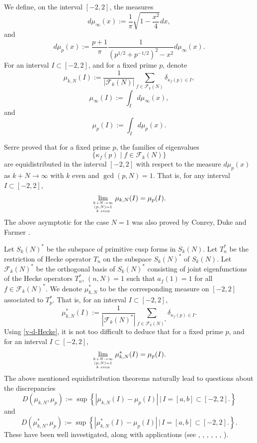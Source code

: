 \documentclass[reqno]{amsart}
\theoremstyle{plain}
\theoremstyle{definition}
\theoremstyle{remark}
\begin{document}
We define, on the interval $[-2,2]$, the measures 
$$d\mu_{\infty}(x) := \frac{1}{\pi}\sqrt{1 - \frac{x^2}{4}}dx,$$
and
$$d\mu_p(x):=\frac{p+1}{\pi}\frac{1}{(p^{1/2}+p^{-1/2})^2-x^2}d\mu_{\infty}(x).$$ 
For an interval $I \subset [-2,2]$, and for a fixed prime $p$, denote
$$\mu_{k,N}(I):= \frac{1}{|\mathcal{F}_k(N)|}\sum_{f\in \mathcal{F}_k(N)}\delta_{\kappa_f(p) \in I},$$
$$\mu_{\infty}(I) := \int_I d\mu_{\infty}(x),$$
and
$$\mu_p(I) := \int_I d\mu_p(x).$$


Serre \cite{Serre} proved that for a fixed prime $p$, the families of eigenvalues
$$\{\kappa_f(p) \mid f \in \mathcal F_k(N)\}$$
are equidistributed in the interval $[-2,2]$ with respect to the measure $d\mu_p(x)$
as $k+N\rightarrow \infty$ with $k$ even and $\gcd(p,N)=1.$  That is, for any interval $I \subset [-2,2]$,
\begin{equation}\label{v-d-Hecke}
\lim_{k+N\rightarrow \infty \atop {(p,N) = 1 \atop{k \text{ even}}}} \mu_{k,N}(I) = \mu_p(I).
\end{equation}
The above asymptotic for the case $N=1$ was also proved by Conrey, Duke and Farmer \cite{CDF}.  

Let $S_k(N)^*$ be the subspace of primitive cusp forms in $S_k(N)$.  Let $T^*_n$ be the restriction of Hecke operator $T_n$ on the subspace $S_k(N)^*$ of $S_k(N)$.  Let 
$\mathcal{F}_k(N)^*$ be the orthogonal basis of $S_k(N)^*$ consisting of joint eigenfunctions of the Hecke operators $T_n^*$, $(n,N) = 1$ such that $a_f(1) = 1$ for all $f \in \mathcal{F}_k(N)^*$.
We denote $\mu_{k,N}^*$ to be the corresponding measure on $[-2,2]$ associated to $T^*_p$.  That is, for an interval $I \subset [-2,2]$,
$$\mu_{k,N}^*(I):= \frac{1}{|\mathcal{F}_k(N)^*|}\sum_{f\in \mathcal{F}_k(N)^*}\delta_{\kappa_f(p) \in I}. $$
Using \eqref{v-d-Hecke}, it is not too difficult to deduce that for a fixed prime $p$, and for an interval $I \subset [-2,2]$,
\begin{equation}\label{v-d-Hecke-new}
\lim_{k+N\rightarrow \infty \atop {(p,N) = 1 \atop{k \text{ even}}}} \mu_{k,N}^*(I) = \mu_p(I).
\end{equation}
The above mentioned equidistribution theorems naturally lead to questions about the discrepancies 
$$D(\mu_{k,N},\mu_p) := \sup\left\{   |\mu_{k,N}(I)-\mu_p(I)|\, \Big|\, I=[a,b]\subset [-2,2] \Big. \right\}$$
and
$$D(\mu_{k,N}^*,\mu_p) := \sup\left\{   |\mu^*_{k,N}(I)-\mu_p(I)|\, \Big|\, I=[a,b]\subset [-2,2] \Big. \right\}.$$
These have been well investigated, along with applications (see \cite{GJS}, \cite{Royer}, \cite{Golubeva}, \cite{MSeffective}, \cite{MS2}, \cite{SZ}, \cite{JS}).  
\end{document}
